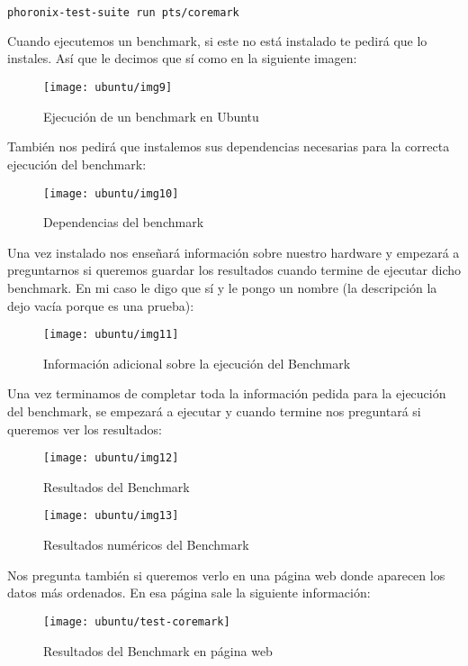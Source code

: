\begin{lstlisting}[language=bash]
    phoronix-test-suite run pts/coremark
\end{lstlisting}

Cuando ejecutemos un benchmark, si este no está instalado te pedirá que lo instales. Así que le decimos que sí como en la siguiente imagen:

\begin{figure}[H]
    \centering
    \texttt{[image: ubuntu/img9]}
    \caption{Ejecución de un benchmark en Ubuntu}
\end{figure}

También nos pedirá que instalemos sus dependencias necesarias para la correcta ejecución del benchmark:

\begin{figure}[H]
    \centering
    \texttt{[image: ubuntu/img10]}
    \caption{Dependencias del benchmark}
\end{figure}
    
Una vez instalado nos enseñará información sobre nuestro hardware y empezará a preguntarnos si queremos guardar los resultados cuando termine de ejecutar dicho benchmark. En mi caso le digo que sí y le pongo un nombre (la descripción la dejo vacía porque es una prueba):

\begin{figure}[H]
    \centering
    \texttt{[image: ubuntu/img11]}
    \caption{Información adicional sobre la ejecución del Benchmark}
\end{figure}

Una vez terminamos de completar toda la información pedida para la ejecución del benchmark, se empezará a ejecutar y cuando termine nos preguntará si queremos ver los resultados:

\begin{figure}[H]
    \centering
    \texttt{[image: ubuntu/img12]}
    \caption{Resultados del Benchmark}
\end{figure}

\begin{figure}[H]
    \centering
    \texttt{[image: ubuntu/img13]}
    \caption{Resultados numéricos del Benchmark}
\end{figure}

Nos pregunta también si queremos verlo en una página web donde aparecen los datos más ordenados. En esa página sale la siguiente información:

\begin{figure}[H]
    \centering
    \texttt{[image: ubuntu/test-coremark]}
    \caption{Resultados del Benchmark en página web}
\end{figure}

